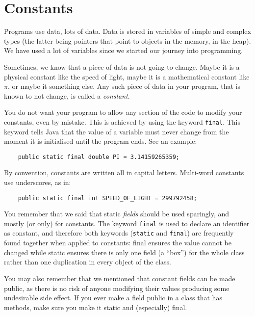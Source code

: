 \section{Constants}
\label{sec:constants}

Programs use data, lots of data. Data is stored in variables of simple
and complex types (the latter being pointers that point to objects in
the memory, in the heap). We have used a lot of variables since we
started our journey into programming. 

Sometimes, we know that a piece of data is not going to change. 
Maybe it is a physical constant like the
speed of light, maybe it is a mathematical constant like $\pi$, or
maybe it something else. Any such piece of data in your program, that
is known to not change, is called a \emph{constant}. 

You do not want your program to allow any section
of the code to modify your constants, even by mistake. This is achieved by
using the keyword \verb+final+. This keyword tells Java that the value
of a variable must never change from the moment it is initialised
until the program ends. See an example: 

\begin{verbatim}
    public static final double PI = 3.14159265359; 
\end{verbatim}

By convention, constants are written all in capital
letters. Multi-word constants use underscores, as in: 

\begin{verbatim}
    public static final int SPEED_OF_LIGHT = 299792458;
\end{verbatim}

You remember that we said that static \emph{fields} should be used
sparingly, and mostly (or only) for constants. The keyword
\verb+final+ is used to declare an identifier as constant, and
therefore both keywords (\verb+static+ and \verb+final+)
are frequently found together when applied to constants: final ensures
the value cannot be changed while static ensures there is only one
field (a ``box'') for the whole class rather than one duplication in
every object of the class.

You may also remember that we mentioned that constant fields can be
made public, as there is no risk of anyone modifying their values
producing some undesirable side effect. If you ever make a field public in a
class that has methods, make sure you make it static and (especially)
final.

